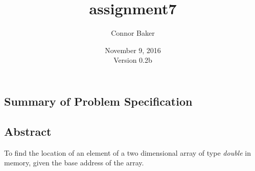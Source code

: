 \documentclass[12pt]{article}
\begin{document}
\null
\nointerlineskip 
\vfill
\let \snewpage \newpage
\let \newpage \relax
    \title{assignment7}
    \author{Connor Baker}
    \date{November 9, 2016\\Version 0.2b}
\maketitle
\let \newpage \snewpage
\vfill
\thispagestyle{empty}



\newpage %



\makeatletter
{}
\renewcommand*\l@section{\@dottedtocline{1}{0em}{1.5em}}
\makeatother
\tableofcontents

\clearpage
{}

\begin{center}
\section{Summary of Problem Specification}
\end{center}
\subsection{Abstract}
To find the location of an element of a two dimensional array of type \textit{double} in memory, given the base address of the array.
\end{document}
